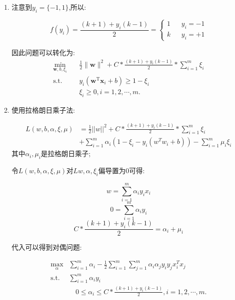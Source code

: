 \documentclass[11pt, a4paper, UTF8]{ctexart}
\begin{document}
\begin{solution}
\begin{enumerate}
	\item 注意到$y_i=\{-1,1\}$,所以:
	
	$$ f(y_i)=\frac{(k+1)+y_i(k-1)}{2}=\left\{
	\begin{aligned}
	1& & y_i=-1\\
	k& & y_i=+1
	\end{aligned}
	\right.
	$$
	
	因此问题可以转化为:
	\begin{equation}
	\label{eq-svm}
	\begin{split}
	\min_{\mathbf{w},b,\xi_i}& \quad \frac{1}{2} \lVert \mathbf{w} \rVert^2 + C*\frac{(k+1)+y_i(k-1)}{2}*\sum_{i=1}^m\xi_i\\
	\text{s.t.}&  \quad y_i(\mathbf{w}^\mathrm{T}\mathbf{x}_i + b)\geq 1-\xi_i\\
	& \quad \xi_i \geq 0, i = 1,2,\cdots,m.
	\end{split}
	\end{equation}
	\item 使用拉格朗日乘子法:
	
	\begin{equation}
	\begin{aligned}
	L(w,b,\alpha,\xi,\mu)&=\frac{1}{2}||w||^2+C*\frac{(k+1)+y_i(k-1)}{2}*\sum_{i=1}^m\xi_i\\& +\sum _{i=1}^{m}\alpha_i(1-\xi_i-y_i(w^Tw_i+b))-\sum_{i=1}^{m}\mu_i\xi_i
	\end{aligned}
	\end{equation}
	其中$\alpha_i,\mu_i$是拉格朗日乘子;
	
	令$L(w,b,\alpha,\xi,\mu)$对$Lw,\alpha,\xi_i$偏导置为0可得:
	
	\begin{equation}
	w=\sum_{i=1}^m\alpha_iy_ix_i
	\end{equation}
		\begin{equation}
	0=\sum_{i=1}^m\alpha_iy_i
	\end{equation}
		\begin{equation}
	C*\frac{(k+1)+y_i(k-1)}{2}=\alpha_i+\mu_i
	\end{equation}
	
	代入可以得到对偶问题:
	
		\begin{equation}
	\label{eq-svm}
	\begin{split}
	\max_{\alpha}&\sum_{i=1}^m\alpha_i-\frac{1}{2}\sum_{i=1}^m\sum_{j=1}^m\alpha_i\alpha_jy_iy_jx_i^Tx_j\\
	\text{s.t.}&  \sum_{i=1}^m\alpha_iy_i\\
	& \quad 0\leq \alpha_i \leq C*\frac{(k+1)+y_i(k-1)}{2}, i = 1,2,\cdots,m.
	\end{split}
	\end{equation}
\end{enumerate}

\end{solution}
\end{document}
